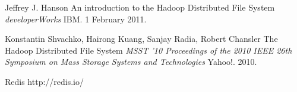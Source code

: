 \documentclass[twoside]{article}
\begin{document}
\begin{multicols}{2}
\begin{thebibliography}{99}
 Jeffrey J. Hanson
\newblock An introduction to the Hadoop Distributed File System
\newblock \textit{developerWorks}
\newblock IBM. 1 February 2011.

 Konstantin Shvachko, Hairong Kuang, Sanjay Radia, Robert Chansler
\newblock The Hadoop Distributed File System
\newblock \textit{MSST '10 Proceedings of the 2010 IEEE 26th Symposium on Mass Storage Systems and Technologies}
\newblock Yahoo!. 2010.

 Redis
\newblock http://redis.io/

\end{thebibliography}



\end{multicols}
\end{document}

